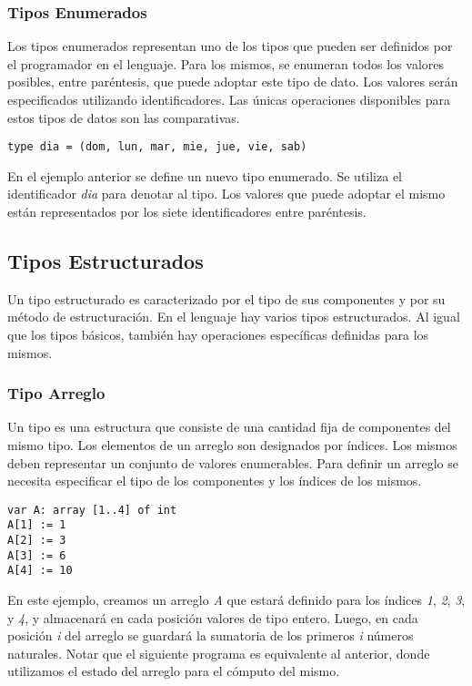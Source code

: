 \documentclass{article}
\begin{document}
\subsubsection{Tipos Enumerados}

Los tipos enumerados representan uno de los tipos que pueden ser definidos por el programador en el lenguaje.
Para los mismos, se enumeran todos los valores posibles, entre paréntesis, que puede adoptar este tipo de dato.
Los valores serán especificados utilizando identificadores.
Las únicas operaciones disponibles para estos tipos de datos son las comparativas.

\begin{lstlisting}
type dia = (dom, lun, mar, mie, jue, vie, sab)
\end{lstlisting}

En el ejemplo anterior se define un nuevo tipo enumerado.
Se utiliza el identificador \textit{dia} para denotar al tipo.
Los valores que puede adoptar el mismo están representados por los siete identificadores entre paréntesis.

\subsection{Tipos Estructurados}

Un tipo estructurado es caracterizado por el tipo de sus componentes y por su método de estructuración.
En el lenguaje hay varios tipos estructurados.
Al igual que los tipos básicos, también hay operaciones específicas definidas para los mismos.

\subsubsection{Tipo Arreglo}

Un tipo  es una estructura que consiste de una cantidad fija de componentes del mismo tipo.
Los elementos de un arreglo son designados por índices.
Los mismos deben representar un conjunto de valores enumerables.
Para definir un arreglo se necesita especificar el tipo de los componentes y los índices de los mismos.

\begin{lstlisting}
var A: array [1..4] of int
A[1] := 1 
A[2] := 3
A[3] := 6
A[4] := 10
\end{lstlisting}

En este ejemplo, creamos un arreglo \textit{A} que estará definido para los índices \textit{1}, \textit{2}, \textit{3}, y \textit{4}, y almacenará en cada posición valores de tipo entero.
Luego, en cada posición \textit{i} del arreglo se guardará la sumatoria de los primeros \textit{i} números naturales.
Notar que el siguiente programa es equivalente al anterior, donde utilizamos el estado del arreglo para el cómputo del mismo.
\end{document}

